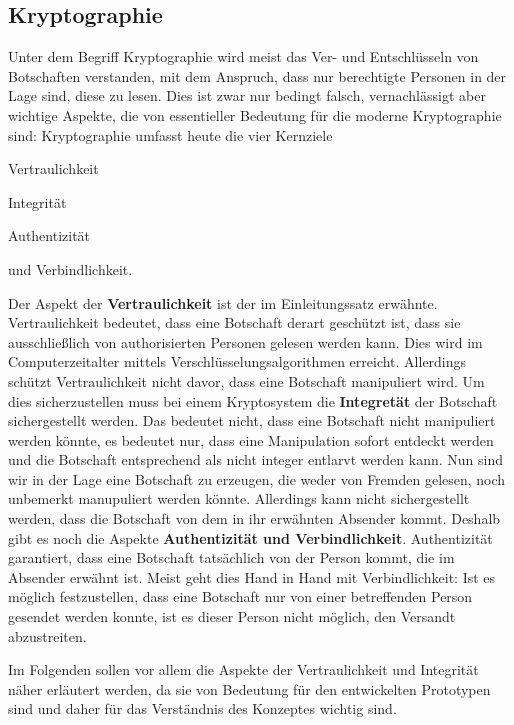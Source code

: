 \documentclass[13pt,a4paper,bibliography=totocnumbered,listof=totocnumbered]{scrartcl}
\begin{document}
\subsection{Kryptographie}\label{KryptV}
Unter dem Begriff Kryptographie wird meist das Ver- und Entschlüsseln von Botschaften verstanden, mit dem Anspruch, dass nur berechtigte Personen in der Lage sind, diese zu lesen. Dies ist zwar nur bedingt falsch, vernachlässigt aber wichtige Aspekte, die von essentieller Bedeutung für die moderne Kryptographie sind: Kryptographie umfasst heute die vier Kernziele
\begin{compactitem}
	\item Vertraulichkeit
	\item Integrität
	\item Authentizität
	\item und Verbindlichkeit.
\end{compactitem}
Der Aspekt der \textbf{Vertraulichkeit} ist der im Einleitungssatz erwähnte. Vertraulichkeit bedeutet, dass eine Botschaft derart geschützt ist, dass sie ausschließlich von authorisierten Personen gelesen werden kann. Dies wird im Computerzeitalter mittels Verschlüsselungsalgorithmen erreicht. Allerdings schützt Vertraulichkeit nicht davor, dass eine Botschaft manipuliert wird. Um dies sicherzustellen muss bei einem Kryptosystem die \textbf{Integretät} der Botschaft sichergestellt werden. Das bedeutet nicht, dass eine Botschaft nicht manipuliert werden könnte, es bedeutet nur, dass eine Manipulation sofort entdeckt werden und die Botschaft entsprechend als nicht integer entlarvt werden kann. Nun sind wir in der Lage eine Botschaft zu erzeugen, die weder von Fremden gelesen, noch unbemerkt manupuliert werden könnte. Allerdings kann nicht sichergestellt werden, dass die Botschaft von dem in ihr erwähnten Absender kommt. Deshalb gibt es noch die Aspekte \textbf{Authentizität und Verbindlichkeit}. Authentizität garantiert, dass eine Botschaft tatsächlich von der Person kommt, die im Absender erwähnt ist. Meist geht dies Hand in Hand mit Verbindlichkeit: Ist es möglich festzustellen, dass eine Botschaft nur von einer betreffenden Person gesendet werden konnte, ist es dieser Person nicht möglich, den Versandt abzustreiten. \cite[S. 2]{42}

Im Folgenden sollen vor allem die Aspekte der Vertraulichkeit und Integrität näher erläutert werden, da sie von Bedeutung für den entwickelten Prototypen sind und daher für das Verständnis des Konzeptes wichtig sind.
\end{document}

